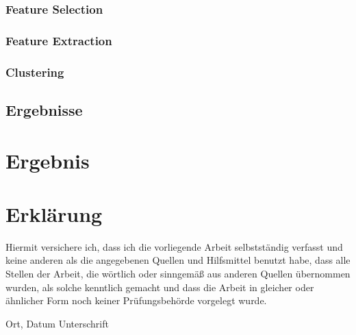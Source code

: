 \subsection{Feature Selection}
\subsection{Feature Extraction}
\subsection{Clustering}
\section{Ergebnisse}

\chapter{Ergebnis}



\listoffigures %

\chapter*{Erklärung}

Hiermit versichere ich, dass ich die vorliegende Arbeit selbstständig verfasst und keine anderen als die angegebenen Quellen und Hilfsmittel benutzt habe, dass alle Stellen der Arbeit, die wörtlich oder sinngemäß aus anderen Quellen übernommen wurden, als solche kenntlich gemacht und dass die Arbeit in gleicher oder ähnlicher Form noch keiner Prüfungsbehörde vorgelegt wurde.

\vspace{3cm}
Ort, Datum \hspace{5cm} Unterschrift\\

